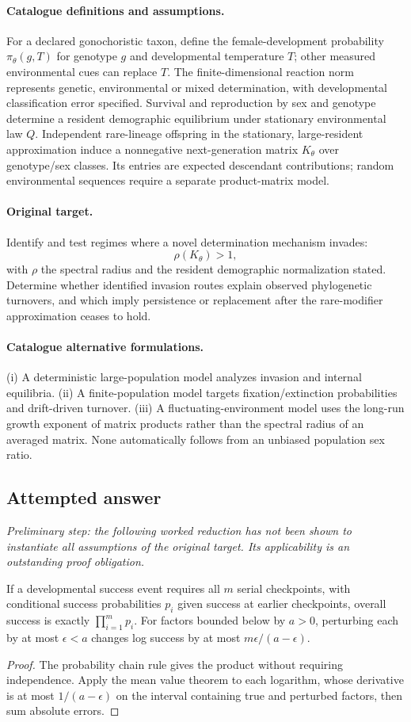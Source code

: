 \documentclass[11pt]{article}
\begin{document}
\paragraph{Catalogue definitions and assumptions.}
For a declared gonochoristic taxon, define the female-development probability $\pi_\theta(g,T)$ for genotype $g$ and developmental temperature $T$; other measured environmental cues can replace $T$. The finite-dimensional reaction norm represents genetic, environmental or mixed determination, with developmental classification error specified. Survival and reproduction by sex and genotype determine a resident demographic equilibrium under stationary environmental law $Q$. Independent rare-lineage offspring in the stationary, large-resident approximation induce a nonnegative next-generation matrix $K_\theta$ over genotype/sex classes. Its entries are expected descendant contributions; random environmental sequences require a separate product-matrix model.
\paragraph{Original target.}
Identify and test regimes where a novel determination mechanism invades:
    \[\rho(K_\theta)>1,\]
    with $\rho$ the spectral radius and the resident demographic normalization stated. Determine whether identified invasion routes explain observed phylogenetic turnovers, and which imply persistence or replacement after the rare-modifier approximation ceases to hold.
\paragraph{Catalogue alternative formulations.}
(i) A deterministic large-population model analyzes invasion and internal equilibria. (ii) A finite-population model targets fixation/extinction probabilities and drift-driven turnover. (iii) A fluctuating-environment model uses the long-run growth exponent of matrix products rather than the spectral radius of an averaged matrix. None automatically follows from an unbiased population sex ratio.
\subsection{Attempted answer}
\noindent\emph{Preliminary step: the following worked reduction has not been shown to instantiate all assumptions of the original target. Its applicability is an outstanding proof obligation.}

\begin{proposition}
If a developmental success event requires all $m$ serial checkpoints, with conditional success probabilities $p_i$ given success at earlier checkpoints, overall success is exactly $\prod_{i=1}^mp_i$. For factors bounded below by $a>0$, perturbing each by at most $\epsilon<a$ changes log success by at most $m\epsilon/(a-\epsilon)$.
\end{proposition}
\begin{proof}
The probability chain rule gives the product without requiring independence. Apply the mean value theorem to each logarithm, whose derivative is at most $1/(a-\epsilon)$ on the interval containing true and perturbed factors, then sum absolute errors.
\end{proof}
\end{document}
